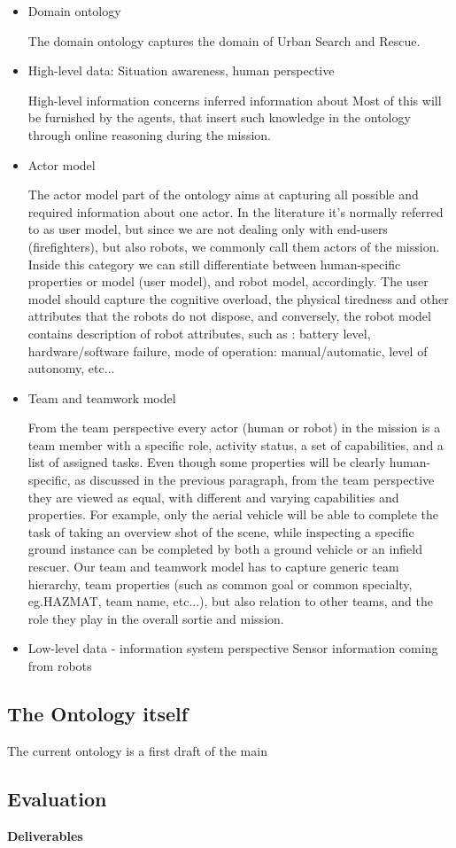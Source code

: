 \begin{itemize}
\item Domain ontology

The domain ontology captures the domain of Urban Search and Rescue.


\item High-level data: Situation awareness, human perspective

High-level information concerns inferred information about 
Most of this will be furnished by the agents, that insert such knowledge in the ontology through online reasoning during the mission. 

\item Actor model

The actor model part of the ontology aims at capturing all possible and required information about one actor. In the literature it's normally referred to as user model, but since we are not dealing only with end-users (firefighters), but also robots, we commonly call them actors of the mission. Inside this category we can still differentiate between human-specific properties or model (user model), and robot model, accordingly. The user model should capture the cognitive overload, the physical tiredness and other attributes that the robots do not dispose, and conversely, the robot model contains description of robot attributes, such as : battery level, hardware/software failure, mode of operation: manual/automatic, level of autonomy, etc... 

\item Team and teamwork model

From the team perspective every actor (human or robot) in the mission is a team member with a specific role, activity status, a set of capabilities, and a list of assigned tasks. Even though some properties will be clearly human-specific, as discussed in the previous paragraph, from the team perspective they are viewed as equal, with different and varying capabilities and properties. For example, only the aerial vehicle will be able to complete the task of taking an overview shot of the scene, while inspecting a specific ground instance can be completed by both a ground vehicle or an infield rescuer. Our team and teamwork model has to capture generic team hierarchy, team properties (such as common goal or common specialty, eg.HAZMAT, team name, etc...), but also relation to other teams, and the role they play in the overall sortie and mission.

\item Low-level data - information system perspective
Sensor information coming from robots

\end{itemize}


\subsection{The Ontology itself}

The current ontology is a first draft of the main 

\subsection{Evaluation}



\textbf{Deliverables}


  